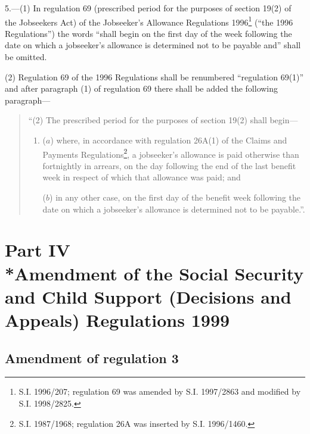\documentclass[12pt,a4paper]{article}
\begin{document}
5.---(1)  In regulation 69 (prescribed period for the purposes of section 19(2) of the Jobseekers Act) of the Jobseeker’s Allowance Regulations 1996\footnote{\frenchspacing S.I. 1996/207; regulation 69 was amended by S.I. 1997/2863 and modified by S.I. 1998/2825.} (“the 1996 Regulations”) the words “shall begin on the first day of the week following the date on which a jobseeker’s allowance is determined not to be payable and” shall be omitted.

(2) Regulation 69 of the 1996 Regulations shall be renumbered “regulation 69(1)” and after paragraph (1) of regulation 69 there shall be added the following paragraph—
\begin{quotation}
“(2) The prescribed period for the purposes of section 19(2) shall begin—
\begin{enumerate}\item[]
\begin{sloppypar}
($a$) where, in accordance with regulation 26A(1) of the Claims and Payments Regulations\footnote{\frenchspacing S.I. 1987/1968; regulation 26A was inserted by S.I. 1996/1460.}, a jobseeker’s allowance is paid otherwise than fortnightly in arrears, on the day following the end of the last benefit week in respect of which that allowance was paid; and
\end{sloppypar}

($b$) in any other case, on the first day of the benefit week following the date on which a jobseeker’s allowance is determined not to be payable.”.
\end{enumerate}
\end{quotation}

\section[Part IV --- Amendment of the Social Security and Child Support (Decisions and Appeals) Regulations 1999]{Part IV\\*Amendment of the Social Security and Child Support (Decisions and Appeals) Regulations 1999}

\renewcommand\parthead{--- Part IV}

\subsection[6. Amendment of regulation 3]{Amendment of regulation 3}
\end{document}
